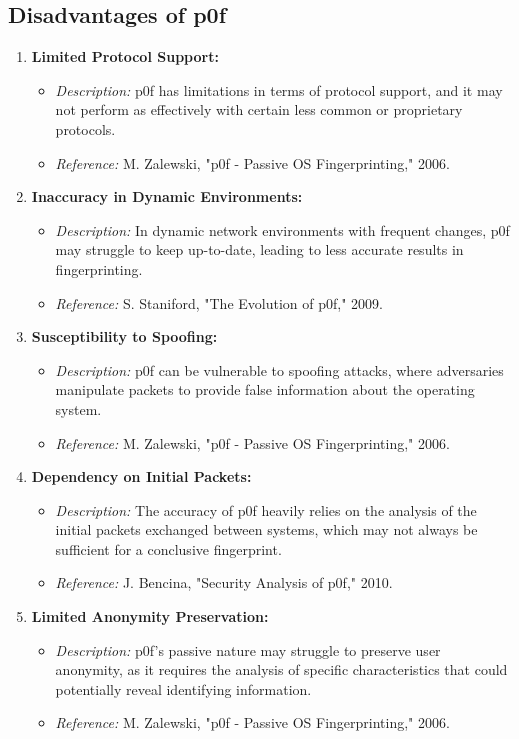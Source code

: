 \documentclass[11pt]{article}
\begin{document}
\subsection{Disadvantages of p0f}

\begin{enumerate}
    \item \textbf{Limited Protocol Support:}
    \begin{itemize}
        \item \textit{Description:} p0f has limitations in terms of protocol support, and it may not perform as effectively with certain less common or proprietary protocols.
        \item \textit{Reference:} M. Zalewski, "p0f - Passive OS Fingerprinting," 2006.
    \end{itemize}

    \item \textbf{Inaccuracy in Dynamic Environments:}
    \begin{itemize}
        \item \textit{Description:} In dynamic network environments with frequent changes, p0f may struggle to keep up-to-date, leading to less accurate results in fingerprinting.
        \item \textit{Reference:} S. Staniford, "The Evolution of p0f," 2009.
    \end{itemize}

    \item \textbf{Susceptibility to Spoofing:}
    \begin{itemize}
        \item \textit{Description:} p0f can be vulnerable to spoofing attacks, where adversaries manipulate packets to provide false information about the operating system.
        \item \textit{Reference:} M. Zalewski, "p0f - Passive OS Fingerprinting," 2006.
    \end{itemize}

    \item \textbf{Dependency on Initial Packets:}
    \begin{itemize}
        \item \textit{Description:} The accuracy of p0f heavily relies on the analysis of the initial packets exchanged between systems, which may not always be sufficient for a conclusive fingerprint.
        \item \textit{Reference:} J. Bencina, "Security Analysis of p0f," 2010.
    \end{itemize}

    \item \textbf{Limited Anonymity Preservation:}
    \begin{itemize}
        \item \textit{Description:} p0f's passive nature may struggle to preserve user anonymity, as it requires the analysis of specific characteristics that could potentially reveal identifying information.
        \item \textit{Reference:} M. Zalewski, "p0f - Passive OS Fingerprinting," 2006.
    \end{itemize}
\end{enumerate}
\end{document}
